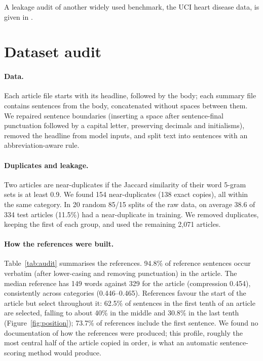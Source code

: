 \documentclass[11pt,a4paper]{article}
\begin{document}
A leakage audit of another widely used benchmark, the UCI heart disease data, is given in \cite{hussain2026heart}.

\section{Dataset audit}\label{sec:audit}
\paragraph{Data.} Each article file starts with its headline, followed by the body; each summary file contains sentences from the body, concatenated without spaces between them. We repaired sentence boundaries (inserting a space after sentence-final punctuation followed by a capital letter, preserving decimals and initialisms), removed the headline from model inputs, and split text into sentences with an abbreviation-aware rule.

\paragraph{Duplicates and leakage.} Two articles are near-duplicates if the Jaccard similarity of their word 5-gram sets is at least 0.9. We found 154 near-duplicates (138 exact copies), all within the same category. In 20 random 85/15 splits of the raw data, on average 38.6 of 334 test articles (11.5\%) had a near-duplicate in training. We removed duplicates, keeping the first of each group, and used the remaining 2,071 articles.

\paragraph{How the references were built.} Table~\ref{tab:audit} summarises the references. 94.8\% of reference sentences occur verbatim (after lower-casing and removing punctuation) in the article. The median reference has 149 words against 329 for the article (compression 0.454), consistently across categories (0.446--0.465). References favour the start of the article but select throughout it: 62.5\% of sentences in the first tenth of an article are selected, falling to about 40\% in the middle and 30.8\% in the last tenth (Figure~\ref{fig:position}); 73.7\% of references include the first sentence. We found no documentation of how the references were produced; this profile, roughly the most central half of the article copied in order, is what an automatic sentence-scoring method would produce.
\end{document}
